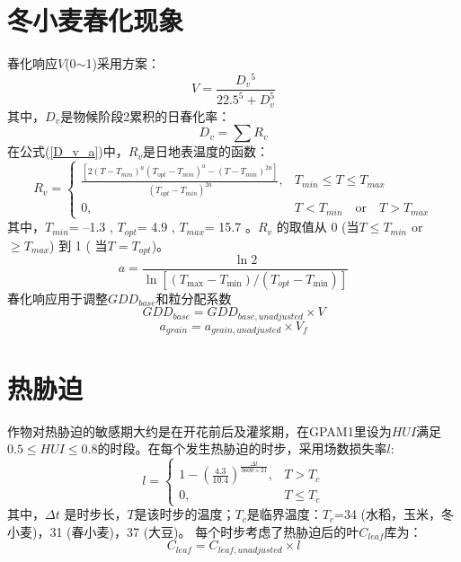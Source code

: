\section{冬小麦春化现象}
春化响应$V$(0$\sim$1)采用\citet{streck2003incorporating}方案：
\begin{equation}
V=\frac{D_{v}{ }^{5}}{22.5^{5}+D_{v}^{5}}
\end{equation}
其中，$D_v$是物候阶段2累积的日春化率：
\begin{equation}\label{D_v_a}
D_{v}=\sum R_{v}
\end{equation}
在公式(\ref{D_v_a})中，$R_{v}$是日地表温度的函数：
\begin{equation}
R_{v} = \begin{cases} 
\frac{\left[2\left(T-T_{min}\right)^{a}\left(T_{opt}-T_{min}\right)^{a} - \left(T-T_{min}\right)^{2a}\right]}{\left(T_{opt}-T_{min}\right)^{2a}}, &T_{min} \leq T \leq T_{max} \\
0,  &T<T_{min} \quad  \text{or} \quad T>T_{max}
\end{cases}
\end{equation}
其中，$T_{min}$= –1.3 \textcelsius, $T_{opt}$= 4.9 \textcelsius, $T_{max}$= 15.7 \textcelsius。$ R_v$ 的取值从 0 (当$ T\leq T_{min}$ or $ \geq  T_{max}$) 到 1 ( 当$T=T_{opt}$)。
\begin{equation}
a=\frac{\ln 2}{\ln \left[\left(T_{\max }-T_{\min }\right) /\left(T_{o p t}-T_{\min }\right)\right]}
\end{equation}
春化响应用于调整$GDD_{base}$和粒分配系数
\begin{equation}
G D D_{b a s e}=G D D_{b a s e,  { unadjusted }} \times V
\end{equation}
\begin{equation}
a_{ {grain }}=a_{ {grain,unadjusted }} \times V_{f}
\end{equation}


\section{热胁迫}
作物对热胁迫的敏感期大约是在开花前后及灌浆期，在GPAM1里设为$HUI $满足$0.5 \leq HUI \leq 0.8$的时段。在每个发生热胁迫的时步，采用场数损失率$l$:
\begin{equation}
l=\left\{\begin{array}{cc}1-\left(\frac{4.3}{10.4}\right)^{\frac{\Delta t}{3600\times 21}}, & T>T_{c} \\ 0, & T \leq T_{c}\end{array}\right.
\end{equation}
其中，$\Delta t$ 是时步长，$T$是该时步的温度；$T_c$是临界温度：$T_c$=34 \textcelsius (水稻，玉米，冬小麦)，31 \textcelsius (春小麦)，37 \textcelsius (大豆)。
每个时步考虑了热胁迫后的叶$C_{leaf}$库为：
\begin{equation}
C_{leaf}=C_{leaf,  {unadjusted}} \times l
\end{equation}


